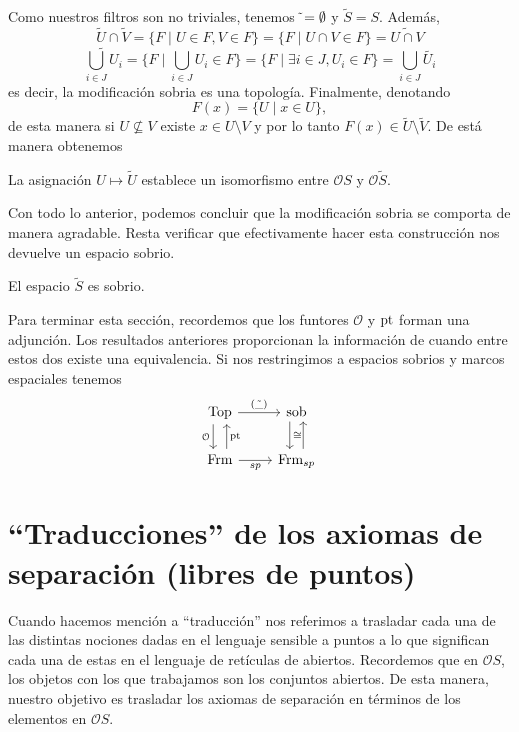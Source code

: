 \documentclass{comunicaciones}
\begin{document}
Como nuestros filtros son no triviales, tenemos $\tilde{\empty}=\emptyset$ y $\tilde{S}=S$. Además,
\[
\tilde{U} \cap \tilde{V}=\{F\mid U\in F, V\in F\}=\{F\mid U\cap V\in F\}=\widetilde{U\cap V}
\]
\[\widetilde{\bigcup_{i\in J}U_i}=\{F\mid \bigcup_{i\in J}U_i\in F\}=\{F\mid \exists i\in J, U_i\in F\}=\bigcup_{i\in J} \widetilde{U_i}
\]
es decir, la modificación sobria es una topología. Finalmente, denotando 
\[
F(x)=\{U\mid x\in U\},
\]
de esta manera si $U\nsubseteq V$ existe $x\in U\setminus V$ y por lo tanto $F(x)\in \tilde{U}\setminus \tilde{V}$. De está manera obtenemos 

\begin{obs}\label{Asobria}
La asignación $U\mapsto \tilde{U}$ establece un isomorfismo entre $\mathcal{O}S$ y $\mathcal{O}\tilde{S}$.
\end{obs}

Con todo lo anterior, podemos concluir que la modificación sobria se comporta de manera agradable. Resta verificar que efectivamente hacer esta construcción nos devuelve un espacio sobrio.

\begin{prop}
    El espacio $\tilde{S}$ es sobrio.
\end{prop}

Para terminar esta sección, recordemos que los funtores $\mathcal{O}$ y $\mathrm{pt}$ forman una adjunción. Los resultados anteriores proporcionan la información de cuando entre estos dos existe una equivalencia. Si nos restringimos a espacios sobrios y marcos espaciales tenemos 
\[\begin{tikzcd}
	\Top & \sob \\
	\Frm & {\Frm_{sp}}
	\arrow["{\mathcal{O}}"', shift right=2, from=1-1, to=2-1]
	\arrow["\pt"', shift right=2, from=2-1, to=1-1]
	\arrow["{(\tilde{\_})}", from=1-1, to=1-2]
	\arrow["sp"', from=2-1, to=2-2]
	\arrow["\cong", shift right=2, from=1-2, to=2-2]
	\arrow[shift right=2, from=2-2, to=1-2]
\end{tikzcd}\]


\section{``Traducciones'' de los axiomas de separación (libres de puntos)}
Cuando hacemos mención a ``traducción'' nos referimos a trasladar cada una de las distintas nociones dadas en el lenguaje sensible a puntos a lo que significan cada una de estas en el lenguaje de retículas de abiertos. Recordemos que en $\mathcal{O}S$, los objetos con los que trabajamos son los conjuntos abiertos. De esta manera, nuestro objetivo es trasladar los axiomas de separación en términos de los elementos en $\mathcal{O}S$.\\
\end{document}
